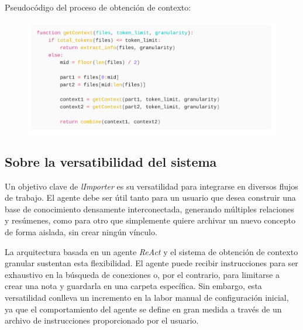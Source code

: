 Pseudocódigo del proceso de obtención de contexto:
\begin{figure}[h]
    \centering
    \includegraphics[width=1.0\textwidth]{figures/getContext.pdf}
\end{figure}

        
        

\subsection{Sobre la versatibilidad del sistema}
Un objetivo clave de \textit{lImporter} es su versatilidad para integrarse en diversos flujos de trabajo. El agente debe ser útil tanto para un usuario que desea construir una base de conocimiento densamente interconectada, generando múltiples relaciones y resúmenes, como para otro que simplemente quiere archivar un nuevo concepto de forma aislada, sin crear ningún vínculo.

La arquitectura basada en un agente \textit{ReAct} y el sistema de obtención de contexto granular sustentan esta flexibilidad. El agente puede recibir instrucciones para ser exhaustivo en la búsqueda de conexiones o, por el contrario, para limitarse a crear una nota y guardarla en una carpeta específica. Sin embargo, esta versatilidad conlleva un incremento en la labor manual de configuración inicial, ya que el comportamiento del agente se define en gran medida a través de un archivo de instrucciones proporcionado por el usuario.

